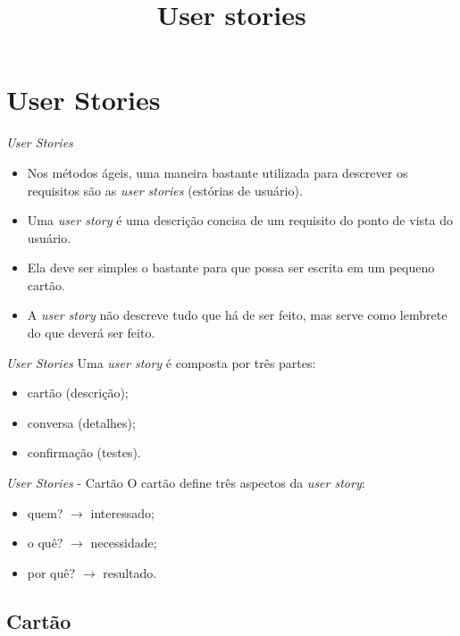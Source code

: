 \documentclass[11pt]{beamer}
\title{User stories}
\author{}
\date{}
\begin{document}
    \begin{frame}[plain]
        \titlepage
    \end{frame}

   \section{User Stories}

   \begin{frame}{\textit{User Stories}}
      \begin{itemize}
         \item Nos métodos ágeis, uma maneira bastante utilizada para descrever os requisitos são as \textit{user stories} (estórias de usuário).
         \item Uma \textit{user story} é uma descrição concisa de um requisito do ponto de vista do usuário.
         \item Ela deve ser simples o bastante para que possa ser escrita em um pequeno cartão.
         \item A \textit{user story} não descreve tudo que há de ser feito, mas serve como lembrete do que deverá ser feito.
      \end{itemize}
   \end{frame}

   \begin{frame}{\textit{User Stories}}
      Uma \textit{user story} é composta por três partes:
      \begin{itemize}
         \item cartão (descrição);
         \item conversa (detalhes);
         \item confirmação (testes).
      \end{itemize}
   \end{frame}

   \begin{frame}{\textit{User Stories} - Cartão}
      O cartão define três aspectos da \textit{user story}:
      \begin{itemize}
         \item quem? $\rightarrow$ interessado;
         \item o quê? $\rightarrow$ necessidade;
         \item por quê? $\rightarrow$ resultado.
      \end{itemize}
   \end{frame}

   \subsection{Cartão}
\end{document}
